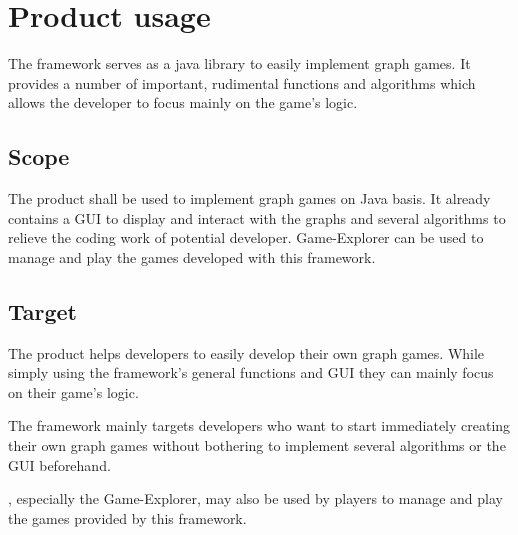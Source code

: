 \section{Product usage}
The \gls{framework} serves as a \Gls{java} \gls{library} to easily implement \gls{graph} \glspl{game}. It provides a number of important, rudimental functions and \glspl{algorithm} which allows the \gls{developer} to focus mainly on the game's logic.

\subsection{Scope}
The product shall be used to implement graph games on Java basis. It already contains a \gls{GUI} to display and interact with the graphs and several algorithms to relieve the coding work of potential developer. {\graphioli} Game-Explorer can be used to manage and play the games developed with this framework.

\subsection{Target}
The product helps developers to easily develop their own graph games. While simply using the framework's general functions and GUI they can mainly focus on their game's logic. \par
The framework mainly targets developers who want to start immediately creating their own graph games without bothering to implement several algorithms or the GUI beforehand. \par
{\graphioli}, especially the Game-Explorer, may also be used by \glspl{player} to manage and play the games provided by this framework.